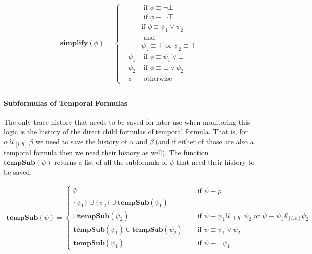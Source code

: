\documentclass[]{../llncs/llncs}
\begin{document}
\begin{align*}
\mathbf{simplify}(\phi) = \left\{
\begin{aligned}
&\top &\text{ if } \phi \equiv \neg \bot \\
&\bot &\text{ if } \phi \equiv \neg \top \\
&\top &\text {if } \phi \equiv \psi_1 \vee \psi_2 \\
& &\text{ and } \\ & & \psi_1 \equiv \top \text{ or } \psi_2 \equiv \top \\
&\psi_1 &\text{ if } \phi \equiv \psi_1 \vee \bot \\
&\psi_2 &\text{ if } \phi \equiv \bot \vee \psi_2 \\
&\phi &\text{ otherwise}
\end{aligned} \right. \\
\end{align*}

\paragraph{Subformulas of Temporal Formulas}
The only trace history that needs to be saved for later use when monitoring this logic is the history of the direct child formulas of temporal formula. That is, for $\alpha\, \mathcal{U}_{[l,h]}\, \beta$ we need to save the history of $\alpha$ and $\beta$ (and if either of those are also a temporal formula then we need their history as well). The function $\mathbf{tempSub}(\psi)$ returns a list of all the subformula of $\psi$ that need their history to be saved.

\begin{align*}
\mathbf{tempSub}(\psi) = \left\lbrace
\begin{aligned}
\emptyset & \quad \text{ if } \psi \equiv p \\
\{\psi_1\} \cup \{\psi_2\} \cup \mathbf{tempSub}(\psi_1) \\
\cup \mathbf{tempSub}(\psi_2) & \quad \text{ if } \psi \equiv \psi_1 \mathcal{U}_{[l,h]} \psi_2 \text{ or } \psi \equiv \psi_1 \mathcal{S}_{[l,h]} \psi_2 \\
\mathbf{tempSub}(\psi_1) \cup \mathbf{tempSub}(\psi_2) & \quad \text{ if } \psi \equiv \psi_1 \vee \psi_2 \\
\mathbf{tempSub}(\psi_1) & \quad \text{ if } \psi \equiv \neg \psi_1
\end{aligned} \right.
\end{align*}
\end{document}
